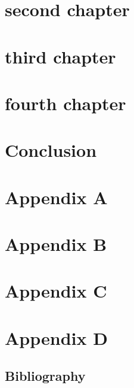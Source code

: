\documentclass[12pt,letterpaper,oneside,final]{memoir}
\begin{document}
\chapter{second chapter} %
    
\chapter{third chapter} %

\chapter{fourth chapter} %

\chapter[Conclusion]{Conclusion}




\begin{appendices} 
\chapter{Appendix A} %

\chapter{Appendix B} %

\chapter{Appendix C} %

\chapter{Appendix D} %

\end{appendices} 

\newpage
\clearpage

\backmatter

\begin{OnehalfSpace}
\setlength{\bibitemsep}{\onelineskip}
\chapter{Bibliography}

\printindex
\end{OnehalfSpace}
\end{document}
